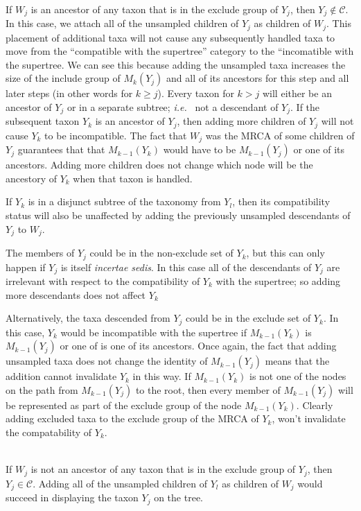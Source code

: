 \documentclass[english]{article}
\newcommand{\incsed}[0]{{\em incertae sedis}\xspace}
\begin{document}
\\
If $W_j$ is an ancestor of any taxon that is in the exclude group of $Y_j$, then $Y_j\notin\mathcal{C}$.
In this case, we attach all of the unsampled children of $Y_j$ as children of $W_j$.
This placement of additional taxa will not cause any subsequently handled taxa to move from
    the ``compatible with the supertree'' category to the ``incomatible with the supertree.
We can see this because adding the unsampled taxa increases the size of the include group
    of $M_{k}(Y_j)$ and all of its ancestors for this step and all later steps (in other words
    for $k \geq j$).
Every taxon for $k>j$ will either be an ancestor of $Y_j$ or in a separate subtree; {\em i.e.~} not a descendant of $Y_j$.
If the subsequent taxon $Y_k$ is an ancestor of $Y_j$, then adding more children of $Y_j$ will not cause $Y_k$ to be incompatible.
The fact that $W_j$ was the MRCA of some children of $Y_j$ guarantees that that $M_{k-1}(Y_k)$
    would have to be $M_{k-1}(Y_j)$ or one of its ancestors.
Adding more children does not change which node will be the ancestory of $Y_k$ when that taxon is handled.

If $Y_k$ is in a disjunct subtree of the taxonomy from $Y_l$, then its compatibility 
status will also be unaffected by adding the previously unsampled descendants of
$Y_j$ to $W_j$.

The members of $Y_j$ could be in the non-exclude set of $Y_k$, but this can only happen if
    $Y_j$ is itself \incsed.
In this case all of the descendants of $Y_j$ are irrelevant with respect to the compatibility
    of $Y_k$ with the supertree; so adding more descendants does not affect $Y_k$

Alternatively, the taxa descended from $Y_j$ could be in the exclude set of $Y_k$.
In this case, $Y_k$ would be incompatible with the supertree if $M_{k-1}(Y_k)$ is
    $M_{k-1}(Y_j)$ or one of is one of its ancestors.
Once again, the fact that adding unsampled taxa does not change the identity of $M_{k-1}(Y_j)$
    means that the addition cannot invalidate $Y_k$ in this way.
If $M_{k-1}(Y_k)$ is not one of the nodes on the path from $M_{k-1}(Y_j)$ to the root, then
    every member of $M_{k-1}(Y_j)$ will be represented as part of the exclude group
    of the node $M_{k-1}(Y_k)$.
Clearly adding excluded taxa to the exclude group of the MRCA of $Y_k$, won't invalidate the 
compatability of $Y_k$. 

\\
If $W_j$ is not an ancestor of any taxon that is in the exclude group of $Y_j$, then $Y_j\in\mathcal{C}$.
Adding all of the unsampled children of $Y_l$ as children of $W_j$ would succeed in displaying
    the taxon $Y_j$ on the tree.
\end{document}
